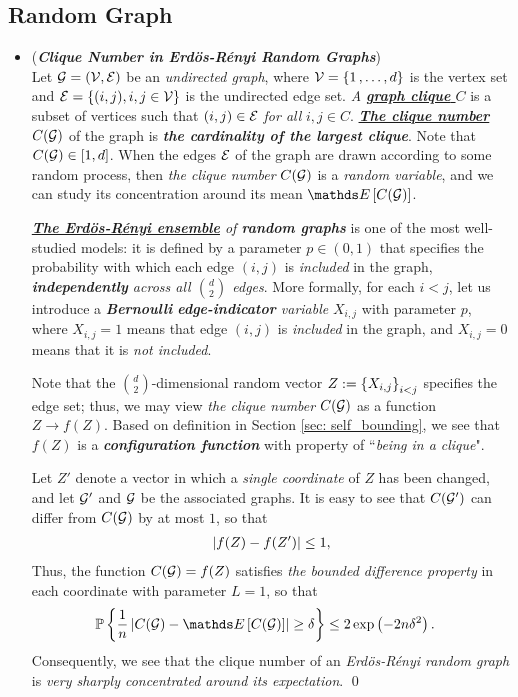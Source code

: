 \documentclass[11pt]{article}
\begin{document}
\subsection{Random Graph}
\begin{itemize}
\item \begin{example} (\textbf{\emph{Clique Number in Erd{\"o}s-R{\'e}nyi Random Graphs}})  \citep{wainwright2019high}\\
Let ${\mathcal G} = ({\mathcal V}, {\mathcal E})$ be an \emph{undirected graph}, where ${\mathcal V} = \left\{1 \,{,}\ldots{,}\, d\right\}$ is the vertex set and ${\mathcal E} = \left\{(i,j), i,j \in {\mathcal V}\right\}$ is the undirected edge set. \emph{A \underline{\textbf{graph clique} $C$}} is a subset of vertices such that $(i, j) \in {\mathcal E}$ \emph{for all} $i, j \in C$. \underline{\emph{\textbf{The clique number}} $C({\mathcal G})$} of the graph is \emph{\textbf{the cardinality of the largest clique}}. Note that $C({\mathcal G}) \in [1, d]$. When the edges ${\mathcal E}$ of the graph are drawn according to some random process, then \emph{the clique number} $C({\mathcal G})$ is a \emph{random variable}, and we can study its concentration around its mean $\E{}{C(\cG)}$.

\emph{\textbf{\underline{The Erd{\"o}s-R{\'e}nyi ensemble}} of \textbf{random graphs}} is one of the most well-studied models: it is defined by a parameter $p \in (0, 1)$ that specifies the probability with which each edge $(i, j)$ is \emph{included} in the graph, \emph{\textbf{independently} across all $d \choose 2$ edges}. More formally, for each $i < j$, let us introduce a \emph{\textbf{Bernoulli} \textbf{edge-indicator} variable} $X_{i,j}$ with parameter $p$, where $X_{i,j} = 1$ means that edge $(i, j)$ is \emph{included} in the graph, and $X_{i,j} = 0$ means that it is \emph{not included}.

Note that the $d \choose 2$-dimensional random vector $Z := \left\{X_{i,j}\right\}_{i< j}$ specifies the edge set; thus, we may view \emph{the clique number} $C({\mathcal G})$ as a function $Z \to f(Z)$. Based on definition in Section \ref{sec: self_bounding}, we see that $f(Z)$ is a \emph{\textbf{configuration function}} with property of ``\emph{being in a clique}".

Let $Z'$ denote a vector in which a \emph{single coordinate} of $Z$ has been changed, and let ${\mathcal G}'$ and ${\mathcal G}$ be the associated graphs. It is easy to see that $C({\mathcal G}')$ can differ from $C({\mathcal G})$ by at most $1$, so that 
\begin{align*}
\left\lvert f(Z) - f(Z') \right\rvert \le 1,
\end{align*}
Thus, the function $C({\mathcal G}) = f(Z)$ satisfies \emph{the bounded difference property} in each coordinate with parameter $L = 1$, so that
\begin{align*}
\bP\set{\frac{1}{n}\abs{C(\cG) - \E{}{C(\cG)}} \ge \delta} &\le 2\exp\paren{- 2 n \delta^2}.
\end{align*}
Consequently, we see that the clique number of an \emph{Erd{\"o}s-R{\'e}nyi random graph} is\emph{ very sharply concentrated around its expectation}. \qed
\end{example}
\end{itemize}
\end{document}
